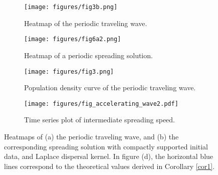 \documentclass[11pt]{article}
\theoremstyle{definition}
\numberwithin{equation}{section}
\numberwithin{thm}{section}
\begin{document}

\begin{figure}[h]
\begin{subfigure}{0.5\textwidth}
\texttt{[image: figures/fig3b.png]}
\caption{Heatmap of the periodic traveling wave.}
\label{fig:subim1}
\end{subfigure}
\begin{subfigure}{0.5\textwidth}
\texttt{[image: figures/fig6a2.png]}
\caption{Heatmap of a periodic spreading solution.}
\label{fig:subim2}
\end{subfigure}
\begin{subfigure}{0.5\textwidth}
 \texttt{[image: figures/fig3.png]}
\caption{Population density curve of the periodic traveling wave.}
\label{fig:laplacewave}
\end{subfigure}
\begin{subfigure}{0.5\textwidth}
 \texttt{[image: figures/fig\_accelerating\_wave2.pdf]}
 \caption{Time series plot of intermediate spreading speed.}
 \label{fig:laplacecompact2}
\end{subfigure}
\caption{Heatmaps of (a) the periodic traveling wave, and (b) the corresponding spreading solution with compactly supported initial data, and Laplace dispersal kernel.
In figure (d), the horizontal blue lines correspond to the theoretical values derived in Corollary \ref{cor1}.}
\label{fig:heatmap}
\end{figure}

%
%
\end{document}
